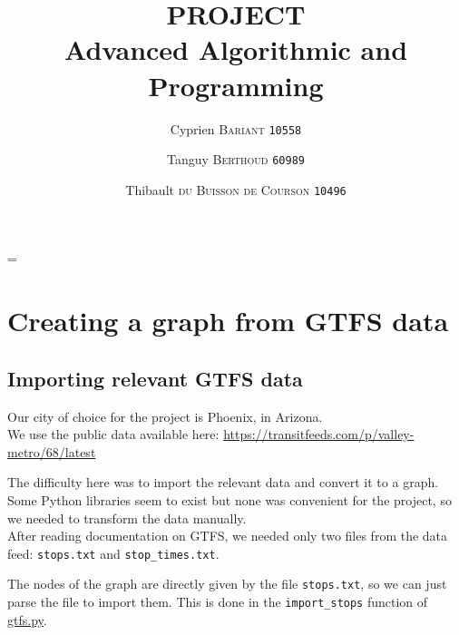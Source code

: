 \documentclass[12pt,english]{article}
\author{
	Cyprien \textsc{Bariant} \texttt{10558}
	\and
	Tanguy \textsc{Berthoud} \texttt{60989}
	\and
	Thibault \textsc{du Buisson de Courson} \texttt{10496}
}
\title{
	\textbf{PROJECT}\\
	Advanced Algorithmic and Programming
}
\begin{document}
	\maketitle\newpage
	\thispagestyle{empty}
	\tableofcontents
	\listoffigures
	\listoftables
	\newpage
	\parskip=\baselineskip%

	\section{Creating a graph from GTFS data}\label{sec:step:1}
	\subsection{Importing relevant GTFS data}\label{sec:step:1.1}

	Our city of choice for the project is Phoenix, in Arizona.\\
	We use the public data available here: \url{https://transitfeeds.com/p/valley-metro/68/latest}

	The difficulty here was to import the relevant data and convert it to a graph.
	Some Python libraries seem to exist but none was convenient for the project, so we needed to transform the data manually.\\
	After reading documentation on GTFS, we needed only two files from the data feed: \texttt{stops.txt} and \texttt{stop\_times.txt}.

	\begin{center}
	\end{center}

	The nodes of the graph are directly given by the file \texttt{stops.txt}, so we can just parse the file to import them.
	This is done in the \texttt{import\_stops} function of \hyperref[sec:code:gtfs]{\ttfamily gtfs.py}.
\end{document}
